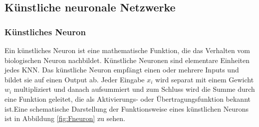 \documentclass[12pt,a4paper]{scrartcl}
\numberwithin{equation}{section}
\begin{document}
\subsection{Künstliche neuronale Netzwerke}
\subsubsection{Künstliches Neuron}
Ein künstliches Neuron \cite{kneuron} ist eine mathematische Funktion, die das Verhalten vom biologischen Neuron nachbildet. Künstliche Neuronen sind elementare Einheiten jedes \ac{KNN}. Das künstliche Neuron empfängt einen oder mehrere Inputs und bildet sie auf einen Output ab. Jeder Eingabe $ x_i $ wird separat mit einem Gewicht $ w_i $ multipliziert und danach aufsummiert und zum Schluss wird die Summe durch eine Funktion geleitet, die als Aktivierungs- oder Übertragungsfunktion bekannt ist.Eine schematische Darstellung der Funktionsweise eines künstlichen Neurons ist in Abbildung  \ref{fig:Fneuron} zu sehen.
\end{document}
